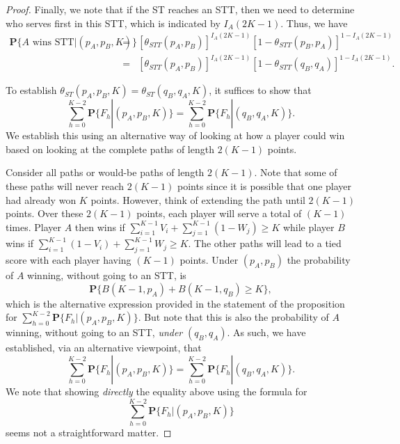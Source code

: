 \documentclass[10pt,a4paper]{amsart}
\newcommand{\OLDPROOF}[1]{}
\renewcommand{\Pr}{\mathbf{P}}
\begin{document}
\begin{proof}
Finally, we note that if the ST reaches an STT, then we need to determine who serves first in this STT, which is indicated by $I_A(2K-1)$. Thus, we have 
%
\begin{eqnarray*}
\Pr\{\mbox{$A$ wins STT}|(p_A,p_B,K)\} & = & [\theta_{STT}(p_A,p_B)]^{I_A(2K-1)} [1-\theta_{STT}(p_B,p_A)]^{1 - I_A(2K-1)} \\ 
& = & [\theta_{STT}(p_A,p_B)]^{I_A(2K-1)} [1-\theta_{STT}(q_B,q_A)]^{1 - I_A(2K-1)}.   
\end{eqnarray*}

To establish $\theta_{ST}(p_A,p_B,K) = \theta_{ST}(q_B,q_A,K)$, it suffices to show that
%
$$\sum_{h=0}^{K-2} \Pr\{F_h|(p_A,p_B,K)\} = 
\sum_{h=0}^{K-2} \Pr\{F_h|(q_B,q_A,K)\}.$$
%
We establish this using an alternative way of looking at how a player could win based on looking at the complete paths of length $2(K-1)$ points.

Consider all paths or would-be paths of length $2(K-1)$. Note that some of these paths will never reach $2(K-1)$ points since it is possible that one player had already won $K$ points. However, think of extending the path until $2(K-1)$ points. Over these $2(K-1)$ points, each player will serve a total of $(K-1)$ times. 
Player $A$ then wins if
%
$\sum_{i=1}^{K-1} V_i + \sum_{j=1}^{K-1} (1-W_j) \ge K$
%
while player $B$ wins if
%
$\sum_{i=1}^{K-1} (1 - V_i) + \sum_{j=1}^{K-1} W_j \ge K.$
%
The other paths will lead to a tied score with each player having $(K-1)$ points. Under $(p_A,p_B)$ the probability of $A$ winning, without going to an STT, is
%
$$\Pr\{B(K-1,p_A) + B(K-1,q_B) \ge K\},$$
which is the alternative expression provided in the statement of the proposition for $\sum_{h=0}^{K-2} \Pr\{F_h|(p_A,p_B,K)\}$.
%
But note that this is also the probability of $A$ winning, without going to an STT, 
{\em under} $(q_B,q_A)$. As such, we have established, via an alternative viewpoint, that 
%
$$\sum_{h=0}^{K-2} \Pr\{F_h|(p_A,p_B,K)\} = 
\sum_{h=0}^{K-2} \Pr\{F_h|(q_B,q_A,K)\}.$$
% 
We note that showing {\em directly} the equality above using the formula for $$\sum_{h=0}^{K-2} \Pr\{F_h|(p_A,p_B,K)\}$$ seems not a straightforward matter.

   
    \OLDPROOF{ The first expression follows from the addition rule of probability and the decomposition of the event that $A$ wins the set tie-breaker.

}
\end{proof}
\end{document}
